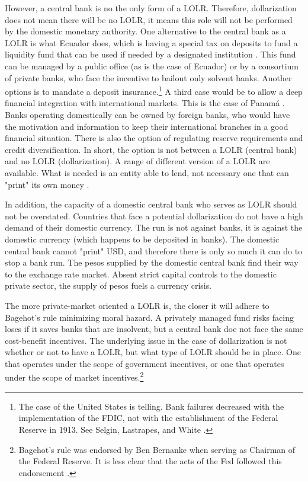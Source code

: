 \documentclass[12pt]{article}
\begin{document}
However, a central bank is no the only form of a LOLR. Therefore, dollarization does not mean there will be no LOLR, it means this role will not be performed by the domestic monetary authority. One alternative to the central bank as a LOLR is what Ecuador does, which is having a special tax on deposits to fund a liquidity fund that can be used if needed by a designated institution \parencite{Quispe-Agnoli2006}. This fund can be managed by a public office (as is the case of Ecuador) or by a consortium of private banks, who face the incentive to bailout only solvent banks. Another options is to mandate a deposit insurance.\footnote{The case of the United States is telling. Bank failures decreased with the implementation of the FDIC, not with the establishment of the Federal Reserve in 1913. See Selgin, Lastrapes, and White \parencite*[][pp. 582-583]{Selgin2012a}.} A third case would be to allow a deep financial integration with international markets. This is the case of Panamá \parencite{MorenoVillalaz1999,MorenoVillalaz2005}. Banks operating domestically can be owned by foreign banks, who would have the motivation and information to keep their international branches in a good financial situation. There is also the option of regulating reserve requirements and credit diversification. In short, the option is not between a LOLR (central bank) and no LOLR (dollarization). A range of different version of a LOLR are available. What is needed is an entity able to lend, not necessary one that can "print" its own money \parencite{Calvo2001}.

In addition, the capacity of a domestic central bank who serves as LOLR should not be overstated. Countries that face a potential dollarization do not have a high demand of their domestic currency. The run is not against banks, it is against the domestic currency (which happens to be deposited in banks). The domestic central bank cannot "print" USD, and therefore there is only so much it can do to stop a bank run. The pesos supplied by the domestic central bank find their way to the exchange rate market. Absent strict capital controls to the domestic private sector, the supply of pesos fuels a currency crisis.

The more private-market oriented a LOLR is, the closer it will adhere to Bagehot's rule minimizing moral hazard. A privately managed fund risks facing loses if it saves banks that are insolvent, but a central bank doe not face the same cost-benefit incentives. The underlying issue in the case of dollarization is not whether or not to have a LOLR, but what type of LOLR should be in place. One that operates under the scope of government incentives, or one that operates under the scope of market incentives.\footnote{Bagehot's rule was endorsed by Ben Bernanke when serving as Chairman of the Federal Reserve. It is less clear that the acts of the Fed followed this endorsement \parencite{Hogan2015b}.}
\end{document}
